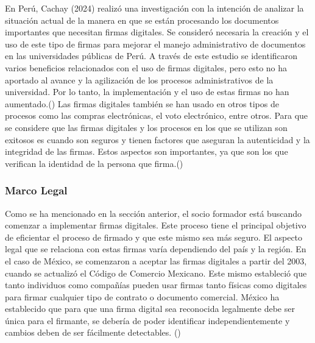 \documentclass[12pt]{article}
\begin{document}
En Perú, Cachay (2024) realizó una investigación con la intención de analizar la situación actual de la manera en que se están procesando los documentos importantes que necesitan firmas digitales. Se consideró necesaria la creación y el uso de este tipo de firmas para mejorar el manejo administrativo de documentos en las universidades públicas de Perú. A través de este estudio se identificaron varios beneficios relacionados con el uso de firmas digitales, pero esto no ha aportado al avance y la agilización de los procesos administrativos de la universidad. Por lo tanto, la implementación y el uso de estas firmas no han aumentado.(\cite{Cachay:2024}) Las firmas digitales también se han usado en otros tipos de procesos como las compras electrónicas, el voto electrónico, entre otros. Para que se considere que las firmas digitales y los procesos en los que se utilizan son exitosos es cuando son seguros y tienen factores que aseguran la autenticidad y la integridad de las firmas. Estos aspectos son importantes, ya que son los que verifican la identidad de la persona que firma.(\cite{Roy:2012})

\subsubsection{Marco Legal}
Como se ha mencionado en la sección anterior, el socio formador está buscando comenzar a implementar firmas digitales. Este proceso tiene el principal objetivo de eficientar el proceso de firmado y que este mismo sea más seguro. El aspecto legal que se relaciona con estas firmas varía dependiendo del país y la región. En el caso de México, se comenzaron a aceptar las firmas digitales a partir del 2003, cuando se actualizó el Código de Comercio Mexicano. Este mismo estableció que tanto individuos como compañías pueden usar firmas tanto físicas como digitales para firmar cualquier tipo de contrato o documento comercial. México ha establecido que para que una firma digital sea reconocida legalmente debe ser única para el firmante, se debería de poder identificar independientemente y cambios deben de ser fácilmente detectables. (\cite{SSL:2024})
\newpage

\printbibliography
\end{document}
